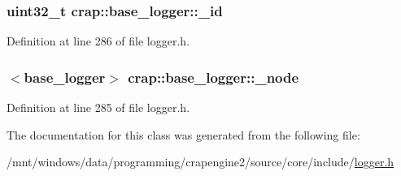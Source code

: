 \subsubsection[{\+\_\+id}]{\setlength{\rightskip}{0pt plus 5cm}uint32\+\_\+t crap\+::base\+\_\+logger\+::\+\_\+id\hspace{0.3cm}{\ttfamily [protected]}}\label{classcrap_1_1base__logger_ae80fa04c0ba60e7a94586d3cc7634abb}


Definition at line 286 of file logger.\+h.

\hypertarget{classcrap_1_1base__logger_aa580a45655e76efb8e5c1dbe81ff4ed8}{}
\subsubsection[{\+\_\+node}]{$<${\bf base\+\_\+logger}$>$ crap\+::base\+\_\+logger\+::\+\_\+node\hspace{0.3cm}{\ttfamily [protected]}}\label{classcrap_1_1base__logger_aa580a45655e76efb8e5c1dbe81ff4ed8}


Definition at line 285 of file logger.\+h.



The documentation for this class was generated from the following file\+:\begin{DoxyCompactItemize}
\item 
/mnt/windows/data/programming/crapengine2/source/core/include/\hyperlink{logger_8h}{logger.\+h}\end{DoxyCompactItemize}
